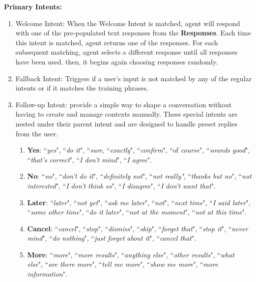 \documentclass{scrreprt}
\begin{document}
\textbf{Primary Intents:}

\begin{enumerate}
    \item Welcome Intent: When the Welcome Intent is matched, agent will respond with one of the pre-populated text responses from the \textbf{Responses}. Each time this intent is matched, agent returns one of the responses. For each subsequent matching, agent selects a different response until all responses have been used. then, it begins again choosing responses randomly.
    
    \item Fallback Intent: Triggers if a user's input is not matched by any of the regular intents or if it matches the training phrases.
    \item Follow-up Intent: provide a simple way to shape a conversation without having to create and manage contexts manually. These special intents are nested under their parent intent and are designed to handle preset replies from the user.
    \begin{enumerate}
        \item \textbf{Yes}: ``\textit{yes}", ``\textit{do it}", ``\textit{sure}, ``\textit{exactly}", ``\textit{confirm}", ``of \textit{course}", ``\textit{sounds good}", ``\textit{that's correct}", ``\textit{I don't mind}", ``\textit{I agree}".
        \item \textbf{No}: ``\textit{no}", ``\textit{don't do it}", ``\textit{definitely not}", ``\textit{not really"}, ``\textit{thanks but no}", ``\textit{not interested}", ``\textit{I don't think so}", ``\textit{I disagree}", ``\textit{I don't want that}".
        \item \textbf{Later}: ``\textit{later}", ``\textit{not yet}", ``\textit{ask me later}", ``\textit{not}", ``\textit{next time}", ``\textit{I said later}", ``\textit{some other time}", ``\textit{do it later}", ``\textit{not at the moment}", ``\textit{not at this time}".
        \item \textbf{Cancel}: ``\textit{cancel}", ``\textit{stop}", ``\textit{dismiss}", ``\textit{skip}", ``\textit{forget that}", ``\textit{stop it}", ``\textit{never mind}", ``\textit{do nothing}", ``\textit{just forget about it}", ``\textit{cancel that}".
        \item \textbf{More}: ``\textit{more}", ``\textit{more results}", ``\textit{anything else}", ``\textit{other results}", ``\textit{what else}", ``\textit{are there more}", ``\textit{tell me more}", ``\textit{show me more}", ``\textit{more information}".

\end{enumerate}
\end{enumerate}
\end{document}
